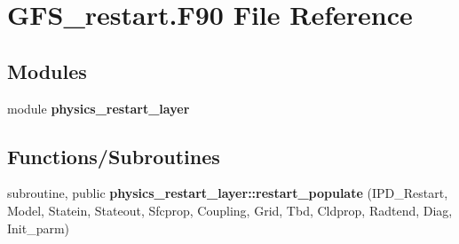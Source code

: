 \section{G\+F\+S\+\_\+restart.\+F90 File Reference}
\label{_g_f_s__restart_8_f90}
\subsection*{Modules}
\begin{DoxyCompactItemize}
\item 
module \textbf{ physics\+\_\+restart\+\_\+layer}
\end{DoxyCompactItemize}
\subsection*{Functions/\+Subroutines}
\begin{DoxyCompactItemize}
\item 
subroutine, public \textbf{ physics\+\_\+restart\+\_\+layer\+::restart\+\_\+populate} (I\+P\+D\+\_\+\+Restart, Model, Statein, Stateout, Sfcprop, Coupling, Grid, Tbd, Cldprop, Radtend, Diag, Init\+\_\+parm)
\end{DoxyCompactItemize}
